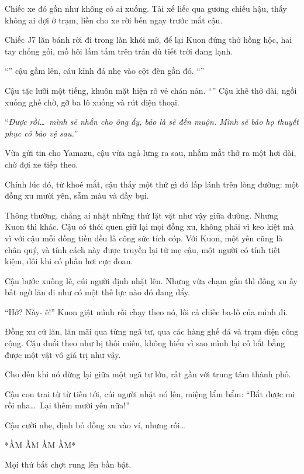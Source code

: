 \documentclass[../main.tex]{subfiles}
\begin{document}
Chiếc xe đó gần như không có ai xuống. Tài xế liếc qua gương chiếu hậu, thấy không ai đợi ở trạm, liền cho xe rời bến ngay trước mắt cậu.

Chiếc J7 lăn bánh rời đi trong làn khói mờ, để lại Kuon đứng thở hồng hộc, hai tay chống gối, mồ hôi lấm tấm trên trán dù tiết trời đang lạnh.

``'' cậu gầm lên, cáu kỉnh đá nhẹ vào cột đèn gần đó. ``''

Cậu tặc lưỡi một tiếng, khuôn mặt hiện rõ vẻ chán nản. ``'' Cậu khẽ thở dài, ngồi xuống ghế chờ, gỡ ba lô xuống và rút điện thoại.

``\textit{Được rồi\dots\ mình sẽ nhắn cho ông ấy, bảo là sẽ đến muộn. Mình sẽ bảo họ thuyết phục cô bảo vệ sau.}''

Vừa gửi tin cho Yamazu, cậu vừa ngả lưng ra sau, nhắm mắt thở ra một hơi dài, chờ đợi xe tiếp theo.

Chính lúc đó, từ khoé mắt, cậu thấy một thứ gì đó lấp lánh trên lòng đường: một đồng xu mười yên, sẫm màu và đầy bụi.

Thông thường, chẳng ai nhặt những thứ lặt vặt như vậy giữa đường. Nhưng Kuon thì khác. Cậu có thói quen giữ lại mọi đồng xu, không phải vì keo kiệt mà vì với cậu mỗi đồng tiền đều là công sức tích cóp. Với Kuon, một yên cũng là chân quý, và tính cách này được truyền lại từ mẹ cậu, một người có tính tiết kiệm, đôi khi có phần hơi cực đoan.

Cậu bước xuống lề, cúi người định nhặt lên. Nhưng vừa chạm gần thì đồng xu ấy bất ngờ lăn đi như có một thế lực nào đó đang đẩy.

``Hở? Này- ê!'' Kuon giật mình rồi chạy theo nó, lôi cả chiếc ba-lô của mình đi.

Đồng xu cứ lăn, lăn mãi qua từng ngã tư, qua các hàng ghế đá và trạm điện công cộng. Cậu đuổi theo như bị thôi miên, không hiểu vì sao mình lại cố bắt bằng được một vật vô giá trị như vậy.

Cho đến khi nó dừng lại giữa một ngã tư lớn, rất gần với trung tâm thành phố.

Cậu con trai từ từ tiến tới, cúi người nhặt nó lên, miệng lẩm bẩm: ``Bắt được mi rồi nha\dots\ Lại thêm mười yên nữa!''

Cậu cười nhẹ, định bỏ đồng xu vào ví, nhưng rồi\dots

*ẦM ẦM ẦM ẦM*

Mọi thứ bất chợt rung lên bần bật.
\end{document}
